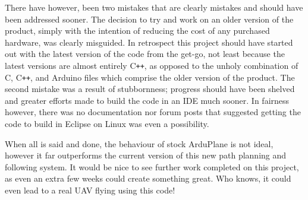 There have however, been two mistakes that are clearly mistakes and should have been addressed sooner. The decision to try and work on an older version of the product, simply with the intention of reducing the cost of any purchased hardware, was clearly misguided. In retrospect this project should have started out with the latest version of the code from the get-go, not least because the latest versions are almost entirely C\texttt{++}, as opposed to the unholy combination of C, C\texttt{++}, and Arduino files which comprise the older version of the product. The second mistake was a result of stubbornness; progress should have been shelved and greater efforts made to build the code in an IDE much sooner. In fairness however, there was no documentation nor forum posts that suggested getting the code to build in Eclipse on Linux was even a possibility. 

When all is said and done, the behaviour of stock ArduPlane is not ideal, however it far outperforms the current version of this new path planning and following system. It would be nice to see further work completed on this project, as even an extra few weeks could create something great. Who knows, it could even lead to a real UAV flying using this code!

